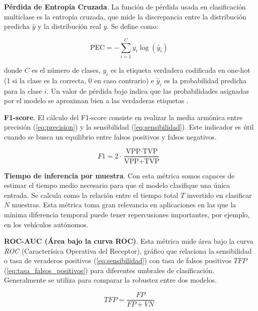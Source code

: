 \textbf{Pérdida de Entropía Cruzada}. La función de pérdida usada en clasificación multiclase es la entropía cruzada, que mide la discrepancia entre la distribución predicha $\hat{y}$ y la distribución real $y$. Se define como:

\begin{equation}
	\text{PEC} = - \sum_{i=1}^{C} y_i \log(\hat{y}_i)
	\label{eq:perdida_entropia_cruzada}
\end{equation}

donde $C$ es el número de clases, $y_i$ es la etiqueta verdadera codificada en one-hot (1 si la clase es la correcta, 0 en caso contrario) e $\hat{y}_i$ es la probabilidad predicha para la clase $i$.
Un valor de pérdida bajo indica que las probabilidades asignadas por el modelo se aproximan bien a las verdaderas etiquetas \cite{dl_fundamentos__casas_roma_2020, dl__goodfellow_2016}.

\textbf{F1-score}. El cálculo del F1-score consiste en realizar la media armónica entre precisión (\ref{eq:precision}) y la sensibilidad (\ref{eq:sensibilidad}). Este indicador es útil cuando se busca un equilibrio entre falsos positivos y falsos negativos.

\begin{equation}
	F1 = 2 \cdot \frac{\text{VPP} \cdot \text{TVP}}{\text{VPP} + \text{TVP}}
	\label{eq:f1_score}
\end{equation}

\textbf{Tiempo de inferencia por muestra}\label{sec:tiempo_inferencia_muestra}. Con esta métrica somos capaces de estimar el tiempo medio necesario para que el modelo clasifique una única entrada. Se calcula como la relación entre el tiempo total $T$ invertido en clasificar $N$ muestras. Esta métrica toma gran relevancia en aplicaciones en las que la mínima diferencia temporal puede tener repercusiones importantes, por ejemplo, en los vehículos autónomos.

\textbf{ROC-AUC (Área bajo la curva ROC)}\label{sec:roc-auc}. Esta métrica mide área bajo la curva \emph{ROC} (Caracterísica Operativa del Receptor), gráfico que relaciona la sensibilidad o tasa de veraderos positivos (\ref{eq:sensibilidad}) con tasa de falsos positivos $TFP$ (\ref{eq:tasa_falsos_positivos}) para diferentes umbrales de clasificación. Generalmente se utiliza para comparar la robustez entre dos modelos.

\begin{equation}
	TFP = \frac{FP}{FP + VN}
	\label{eq:tasa_falsos_positivos}
\end{equation}

